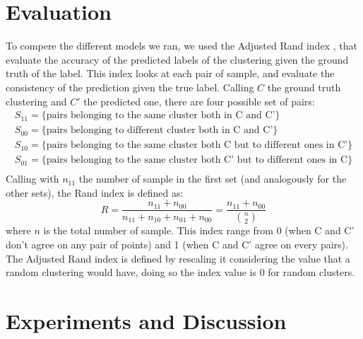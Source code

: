 \documentclass[]{article}
\begin{document}
	\section{Evaluation}
	To compere the different models we ran, we used the Adjusted Rand index \cite{rand},  that evaluate the accuracy of the predicted labels of the clustering given the ground truth of the label. 
	This index looks at each pair of sample, and evaluate the consistency of the prediction given the true label. Calling $C$ the ground truth clustering and $C'$ the predicted one, there are four possible set of pairs:
	$$
	\begin{array}{ll}
	S_{11} = \{\text{pairs belonging to the same cluster both in C and C'} \}\\
	S_{00} =  \{\text{pairs belonging to different cluster both in C and C'} \}\\
	S_{10} =  \{\text{pairs belonging to the same cluster both C but to different ones in C'} \}\\
	S_{01} =  \{\text{pairs belonging to the same cluster both C' but to different ones in C} \}\\
	\end{array}
	$$
	Calling with $n_{11}$ the number of sample in the first set (and analogously for the other sets), the Rand index is defined as:
	$$
	R=\frac{n_{11}+n_{00}}{n_{11}+n_{10}+n_{01}+n_{00}} = \frac{n_{11}+n_{00}}{{ n\choose 2}}
	$$
	where $n$ is the total number of sample. This index range from 0 (when C and C' don't agree on any pair of points) and 1 (when C and C' agree on every pairs). The Adjusted Rand index is defined by rescaling it considering the value that a random clustering would have, doing so the index value is 0 for random clusters. 
	
	\section{Experiments and Discussion}
\end{document}
